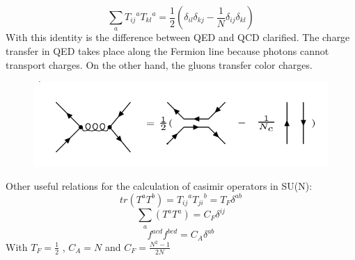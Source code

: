 \begin{equation}
\displaystyle\sum\limits_{a} {T_{ij}}^a {T_{kl}}^a = \frac{1}{2}(\delta_{il}\delta_{kj}-\frac{1}{N}\delta_{ij}\delta_{kl})
\label{Fierz}
\end{equation}
With this identity is the difference between QED and QCD clarified. The charge transfer in QED takes place along the Fermion line because photons cannot transport charges. On the other hand, the gluons transfer color charges. 
\begin{figure}[h!]
\centering
\includegraphics[scale=0.6]{images/Intro/Fritz.png}
\end{figure}
 

Other useful relations for the calculation of casimir operators in SU(N):
\begin{equation}
tr(T^a T^b)= {T_{ij}}^a {T_{ji}}^b = T_F \delta^{ab}
\end{equation}
\begin{equation}
\displaystyle\sum\limits_{a} (T^a T^a) = C_F \delta^{ij}
\end{equation}
\begin{equation}
f^{acd} f^{bcd} = C_A \delta^{ab}
\end{equation}
With $  T_F = \frac{1}{2} $ , $ C_A = N $ and $ C_F = \frac{N^2 -1}{2N} $



\newpage